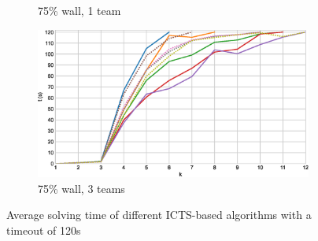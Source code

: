 \documentclass[english]{article}
\newcommand\graphwidth{0.49\textwidth}
\begin{document}
\begin{figure}[t]
\begin{subfigure}{\graphwidth}
			\caption{75\% wall, 1 team}
			\label{fig:i-75-1}
		\end{subfigure}
		\begin{subfigure}{\graphwidth}
			\centering
			\includegraphics[width=\linewidth]{img/results/icts-comparison/75-3}
			\caption{75\% wall, 3 teams}
			\label{fig:i-75-3}
		\end{subfigure}
		\caption{Average solving time of different ICTS-based algorithms with a timeout of 120s}
		\label{fig:i-times}
	\end{figure}
\end{document}
